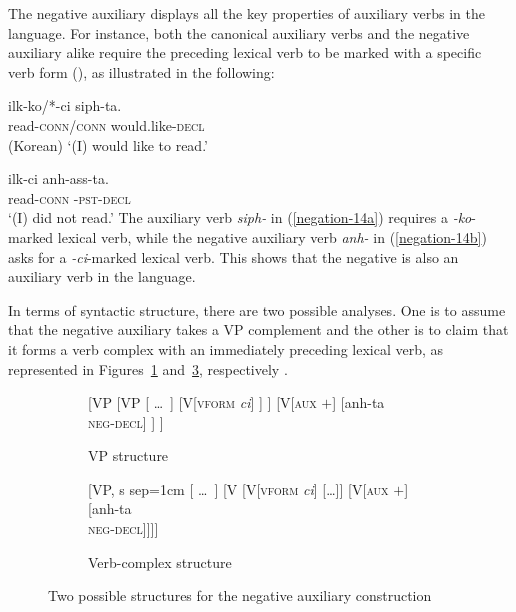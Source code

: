 \documentclass[output=paper,biblatex,babelshorthands,newtxmath,draftmode,colorlinks,citecolor=brown]{langscibook}
\begin{document}
\begin{exe}
\begin{xlist}
\begin{exe}
\begin{xlist}
The  negative auxiliary displays all the key properties of auxiliary verbs in the
language. For instance, both the canonical auxiliary verbs and the negative auxiliary alike require
the preceding lexical verb to be marked with a specific verb form (\vform), as illustrated in the
following:

\eal
\ex\label{negation-14a}
\gll ilk-ko/*-ci siph-ta. \\
     read-\textsc{conn}/\textsc{conn} would.like-\textsc{decl} \\\hfill(Korean)
\glt `(I) would like to read.'

\ex\label{negation-14b}
\gll ilk-ci anh-ass-ta. \\
     read-\textsc{conn} \NEG-\textsc{pst}-\textsc{decl} \\
\glt `(I) did not read.'
\zl
\noindent
The auxiliary verb \textit{siph-} in (\ref{negation-14a}) requires a
\textit{-ko}-marked lexical verb, while the negative auxiliary
 verb \textit{anh-} in (\ref{negation-14b}) asks for a \textit{-ci}-marked lexical
 verb. This shows that the negative is also an auxiliary verb in the language.

In terms of syntactic structure, there
are two possible analyses.  One is to assume that the negative auxiliary takes a VP complement and the other is to claim that it forms a verb complex with
an immediately preceding lexical verb, as represented in Figures~\ref{negation-fig:3a} and~\ref{negation-fig:3b}, respectively
\citep{Chung98a-u, Kim:16}.
\begin{figure}
	\begin{subfigure}[b]{0.48\textwidth}
\centering
		\begin{forest}
			[VP
				[VP
					[ \dots\ ]
					[V{[\textsc{vform} \textit{ci}]}
					]
					]
				[V{[\textsc{aux $+$}]}
					[anh-ta\\ \textsc{neg-decl}]
				]
			]	
		\end{forest}
	\caption{VP structure}\label{negation-fig:3a}
		\end{subfigure}	
\hfill
	\begin{subfigure}[b]{0.48\textwidth}
\centering
		\begin{forest}
			[VP, s sep=1cm
				[ \dots\ ]
				[V
					[V{[\textsc{vform} \textit{ci}]}
						[\dots]]
					[V{[\textsc{aux $+$}]}
						[anh-ta\\ \textsc{neg-decl}]]]]
		\end{forest}
	\caption{Verb-complex structure}\label{negation-fig:3b}	
		\end{subfigure}
	\caption{Two possible structures for the negative auxiliary construction}
\end{figure}


\end{xlist}
\end{exe}
\end{xlist}
\end{exe}
\end{document}
